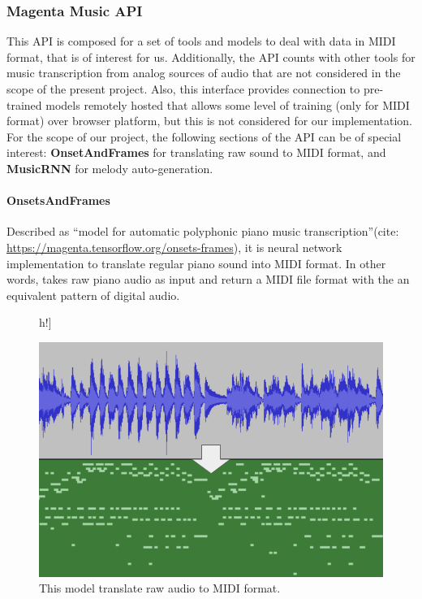 \subsubsection{Magenta Music API}

This API is composed for a set of tools and models to deal with data in MIDI format, that
is of interest for us. Additionally, the API counts with other tools for music
transcription from analog sources of audio that are not considered in the scope of the
present project. Also, this interface provides connection to pre-trained models remotely
hosted that allows some level of training (only for MIDI format) over browser platform,
but this is not considered for our implementation. For the scope of our project, the
following sections of the API can be of special interest: \textbf{OnsetAndFrames} for
translating raw sound to MIDI format, and \textbf{MusicRNN} for melody auto-generation.

\paragraph{OnsetsAndFrames} Described as “model for automatic polyphonic piano music
transcription”(cite: \url{https://magenta.tensorflow.org/onsets-frames}), it is neural
network implementation to translate regular piano sound into MIDI format. In other words,
takes raw piano audio as input and return a MIDI file format with the an equivalent
pattern of digital audio.

\begin{figure}[]h!]
  \centering
  \caption{This model translate raw audio to MIDI format.}
  \includegraphics[width=\linewidth]{image/fig_JDF02.png}
\end{figure}

